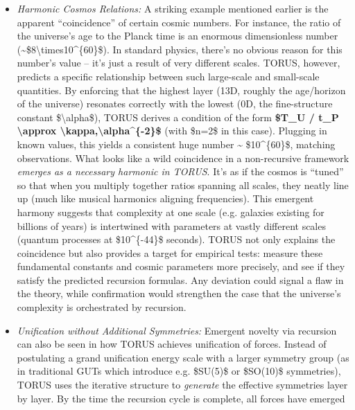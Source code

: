 \documentclass[
]{article}
\begin{document}
\begin{itemize}
\item
  \emph{Harmonic Cosmos Relations:} A striking example mentioned earlier
  is the apparent ``coincidence'' of certain cosmic numbers. For
  instance, the ratio of the universe's age to the Planck time is an
  enormous dimensionless number
  (\textasciitilde\$8\textbackslash times10\^{}\{60\}\$). In standard
  physics, there's no obvious reason for this number's value -- it's
  just a result of very different scales. TORUS, however, predicts a
  specific relationship between such large-scale and small-scale
  quantities. By enforcing that the highest layer (13D, roughly the
  age/horizon of the universe) resonates correctly with the lowest (0D,
  the fine-structure constant \$\textbackslash alpha\$), TORUS derives a
  condition of the form \textbf{\$T\_U / t\_P \textbackslash approx
  \textbackslash kappa,\textbackslash alpha\^{}\{-2\}\$} (with \$n=2\$
  in this case)\hspace{0pt}. Plugging in known values, this yields a
  consistent huge number \textasciitilde{} \$10\^{}\{60\}\$, matching
  observations. What looks like a wild coincidence in a non-recursive
  framework \emph{emerges as a necessary harmonic in TORUS}. It's as if
  the cosmos is ``tuned'' so that when you multiply together ratios
  spanning all scales, they neatly line up (much like musical harmonics
  aligning frequencies). This emergent harmony suggests that complexity
  at one scale (e.g. galaxies existing for billions of years) is
  intertwined with parameters at vastly different scales (quantum
  processes at \$10\^{}\{-44\}\$ seconds). TORUS not only explains the
  coincidence but also provides a target for empirical tests: measure
  these fundamental constants and cosmic parameters more precisely, and
  see if they satisfy the predicted recursion formulas\hspace{0pt}. Any
  deviation could signal a flaw in the theory, while confirmation would
  strengthen the case that the universe's complexity is orchestrated by
  recursion.
\item
  \emph{Unification without Additional Symmetries:} Emergent novelty via
  recursion can also be seen in how TORUS achieves unification of
  forces. Instead of postulating a grand unification energy scale with a
  larger symmetry group (as in traditional GUTs which introduce e.g.
  \$SU(5)\$ or \$SO(10)\$ symmetries), TORUS uses the iterative
  structure to \emph{generate} the effective symmetries layer by layer.
  By the time the recursion cycle is complete, all forces have emerged

\end{itemize}
\end{document}
